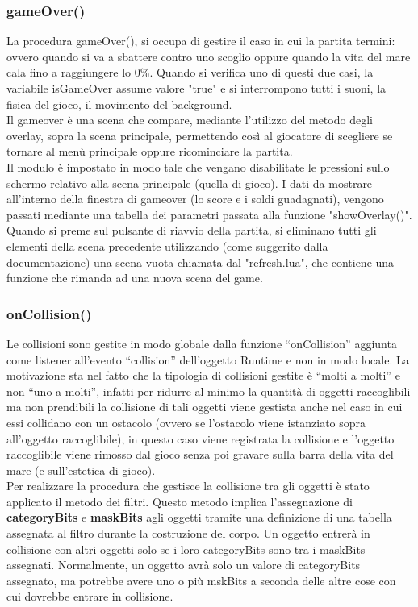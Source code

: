 \documentclass[12pt]{article}
\begin{document}
\subsubsection{gameOver()}
La procedura gameOver(), si occupa di gestire il caso in cui la partita termini: ovvero quando si va a sbattere contro uno scoglio oppure quando la vita del mare cala fino a raggiungere lo 0\%. Quando si verifica uno di questi due casi, la variabile isGameOver assume valore "true" e si interrompono tutti i suoni, la fisica del gioco, il movimento del background.\\

Il gameover è una scena che compare, mediante l'utilizzo del metodo degli overlay, sopra la scena principale, permettendo così al giocatore di scegliere se tornare al menù principale oppure ricominciare la partita.\\ 

Il modulo è impostato in modo tale che vengano disabilitate le pressioni sullo schermo relativo alla scena principale (quella di gioco). I dati da mostrare all'interno della finestra di gameover (lo score e i soldi guadagnati), vengono passati mediante una tabella dei parametri passata alla funzione "showOverlay()".\\

Quando si preme sul pulsante di riavvio della partita, si eliminano tutti gli elementi della scena precedente utilizzando (come suggerito dalla documentazione) una scena vuota chiamata dal  "refresh.lua", che contiene una funzione che rimanda ad una nuova scena del game.
\subsubsection{onCollision()}
Le collisioni sono gestite in modo globale dalla funzione “onCollision” aggiunta come
listener all’evento “collision” dell’oggetto Runtime e non in modo locale.
La motivazione sta nel fatto che la tipologia di collisioni gestite è “molti a molti” e non
“uno a molti”, infatti per ridurre al minimo la quantità di oggetti raccoglibili ma non
prendibili la collisione di tali oggetti viene gestista anche nel caso in cui essi collidano con un
ostacolo (ovvero se l’ostacolo viene istanziato sopra all’oggetto raccoglibile), in questo
caso viene registrata la collisione e l’oggetto raccoglibile viene rimosso dal gioco senza
poi gravare sulla barra della vita del mare (e sull’estetica di gioco).\\

Per realizzare la procedura che gestisce la collisione tra gli oggetti è stato applicato il metodo dei filtri. 
Questo metodo implica l'assegnazione di \textbf{categoryBits} e \textbf{maskBits} agli oggetti tramite una definizione di una 
tabella assegnata al filtro durante la costruzione del corpo. Un oggetto entrerà in collisione con altri oggetti solo se i loro 
categoryBits sono tra i maskBits assegnati. Normalmente, un oggetto avrà solo un valore di categoryBits assegnato, ma potrebbe avere 
uno o più mskBits a seconda delle altre cose con cui dovrebbe entrare in collisione.
\end{document}
